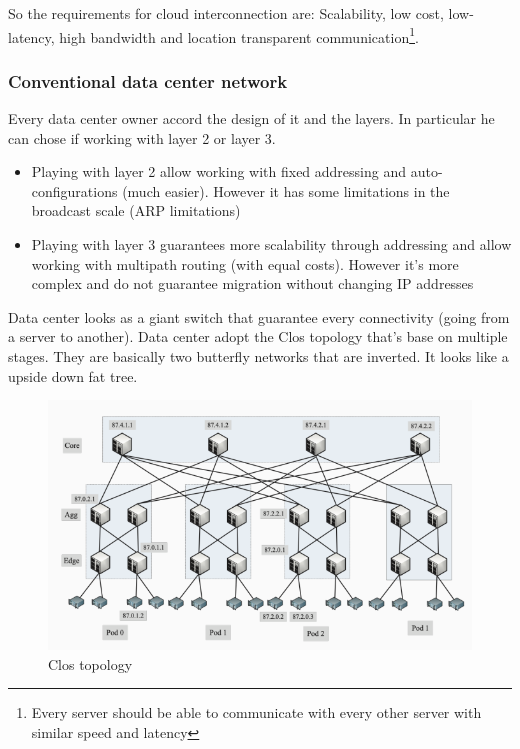         So the requirements for cloud interconnection are: Scalability, low cost, low-latency, high bandwidth and location transparent communication\footnote{Every server should be able to communicate with every other server with similar speed and latency}.
        
        
    \subsubsection{Conventional data center network}
        Every data center owner accord the design of it and the layers. In particular he can chose if working with layer 2 or layer 3.
        \begin{itemize}
            \item Playing with layer 2 allow working with fixed addressing and auto-configurations (much easier). However it has some limitations in the broadcast scale (ARP limitations)
            \item Playing with layer 3 guarantees more scalability through addressing and allow working with multipath routing (with equal costs). However it's more complex and do not guarantee migration without changing IP addresses
        \end{itemize}
        
        \FloatBarrier
        Data center looks as a giant switch that guarantee every connectivity (going from a server to another).
        Data center adopt the Clos topology that's base on  multiple stages. They are basically two butterfly networks that are inverted. It looks like a upside down fat tree.
        \begin{figure}[h!]
            \centering
            \includegraphics[scale=0.4]{images/clos topology.png}
            \caption{Clos topology}
            \label{fig:nettiers}
        \end{figure}
        \FloatBarrier
        
